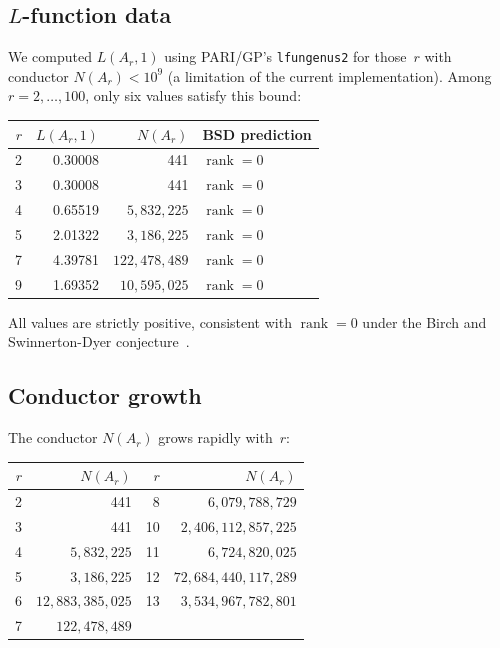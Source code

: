 \documentclass[11pt]{amsart}
\theoremstyle{plain}
\theoremstyle{definition}
\theoremstyle{remark}
\newcommand{\rank}{\operatorname{rank}}
\begin{document}
\subsection{$L$-function data}

We computed $L(A_r,1)$ using PARI/GP's \texttt{lfungenus2} for those~$r$ with
conductor $N(A_r)<10^9$ (a limitation of the current implementation).
Among $r=2,\dots,100$, only six values satisfy this bound:

\begin{center}
\begin{tabular}{rrrl}
\toprule
$r$ & $L(A_r,1)$ & $N(A_r)$ & BSD prediction \\
\midrule
2 & 0.30008 & 441                & $\rank=0$ \\
3 & 0.30008 & 441                & $\rank=0$ \\
4 & 0.65519 & $5{,}832{,}225$    & $\rank=0$ \\
5 & 2.01322 & $3{,}186{,}225$    & $\rank=0$ \\
7 & 4.39781 & $122{,}478{,}489$  & $\rank=0$ \\
9 & 1.69352 & $10{,}595{,}025$   & $\rank=0$ \\
\bottomrule
\end{tabular}
\end{center}

All values are strictly positive, consistent with $\rank=0$ under the Birch and
Swinnerton-Dyer conjecture~\cite{BSD1965}.

\subsection{Conductor growth}

The conductor $N(A_r)$ grows rapidly with~$r$:

\begin{center}
\begin{tabular}{rr|rr}
\toprule
$r$ & $N(A_r)$ & $r$ & $N(A_r)$ \\
\midrule
2  & 441              & 8  & $6{,}079{,}788{,}729$       \\
3  & 441              & 10 & $2{,}406{,}112{,}857{,}225$ \\
4  & $5{,}832{,}225$  & 11 & $6{,}724{,}820{,}025$       \\
5  & $3{,}186{,}225$  & 12 & $72{,}684{,}440{,}117{,}289$ \\
6  & $12{,}883{,}385{,}025$ & 13 & $3{,}534{,}967{,}782{,}801$ \\
7  & $122{,}478{,}489$ \\
\bottomrule
\end{tabular}
\end{center}
\end{document}
